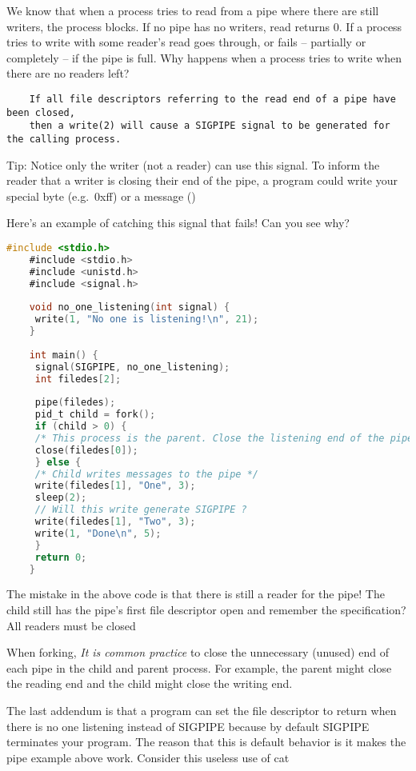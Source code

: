 	We know that when a process tries to read from a pipe where there are still writers, the process blocks.
	If no pipe has no writers, read returns 0.
	If a process tries to write with some reader's read goes through, or fails -- partially or completely -- if the pipe is full.
	Why happens when a process tries to write when there are no readers left?
	 
	\begin{verbatim}
	If all file descriptors referring to the read end of a pipe have been closed,
	then a write(2) will cause a SIGPIPE signal to be generated for the calling process.
	\end{verbatim}
	 
	Tip: Notice only the writer (not a reader) can use this signal.
	To inform the reader that a writer is closing their end of the pipe, a program could write your special byte (e.g.~0xff) or a message ()
	 
	Here's an example of catching this signal that fails! Can you see why?
	 
	\begin{lstlisting}[language=C]
	#include <stdio.h>
	#include <stdio.h>
	#include <unistd.h>
	#include <signal.h>
	 
	void no_one_listening(int signal) {
	 write(1, "No one is listening!\n", 21);
	}
	 
	int main() {
	 signal(SIGPIPE, no_one_listening);
	 int filedes[2];
	 
	 pipe(filedes);
	 pid_t child = fork();
	 if (child > 0) {
	 /* This process is the parent. Close the listening end of the pipe */
	 close(filedes[0]);
	 } else {
	 /* Child writes messages to the pipe */
	 write(filedes[1], "One", 3);
	 sleep(2);
	 // Will this write generate SIGPIPE ?
	 write(filedes[1], "Two", 3);
	 write(1, "Done\n", 5);
	 }
	 return 0;
	}
	\end{lstlisting}
	 
	The mistake in the above code is that there is still a reader for the pipe!
	The child still has the pipe's first file descriptor open and remember the specification? All readers must be closed
	 
	When forking, \emph{It is common practice} to close the unnecessary (unused) end of each pipe in the child and parent process.
	For example, the parent might close the reading end and the child might close the writing end.
	 
	The last addendum is that a program can set the file descriptor to return when there is no one listening instead of SIGPIPE because by default SIGPIPE terminates your program.
	The reason that this is default behavior is it makes the pipe example above work.
	Consider this useless use of cat
	 

